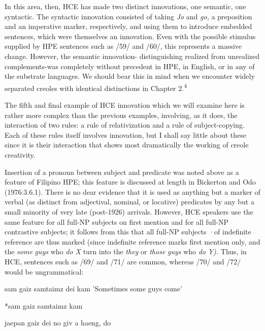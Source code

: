 In this area, then, HCE has made two distinct innovations, one semantic, one syntactic. The syntactic innovation consisted of taking \textit{Jo} and \textit{go,} a preposition and an imperative marker, respectively, and using them to introduce embedded sentences, which were themselves an innovation. Even with the possible stimulus supplied by HPE sen\-tences such as /59/ and /60/, this represents a massive change. However, the semantic innovation- distinguishing realized from unrealized com\-plements-was completely without precedent in HPE, in English, or in any of the substrate languages. We should bear this in mind when we encounter widely separated creoles with identical distinctions in Chapter 2.\textsuperscript{4}

The fifth and final example of HCE innovation which we will examine here is rather more complex than the previous examples, involving, as it does, the interaction of two rules: a rule of relativization and a rule of subject-copying. Each of these rules itself involves inno\-vation, but I shall say little about these since it is their interaction that shows most dramatically the working of creole creativity.

  


 


Insertion of a pronoun between subject and predicate was noted above as a feature of Filipino HPE; this feature is discussed at length in Bickerton and Odo (1976:3.6.1). There is no dear evidence that it is used as anything but a marker of verbal (as distinct from adjectival, nominal, or locative) predicates by any but a small minority of very late (post-1926) arrivals. However, HCE speakers use the same feature for all full-NP subjects on first mention and for all full-NP contrastive subjects; it follows from this that all full-NP subjects ·of indefinite refer\-ence are thus marked (since indefinite reference marks first mention only, and the \textit{some} \textit{guys} who \textit{do X }turn into the \textit{they} or \textit{those} \textit{guys }who \textit{do} \textit{Y}\textit{).} Thus, in HCE, sentences such as /69/ and /71/ are common, whereas /70/ and /72/ would be ungrammatical:

\ea\label{ex:69}
 sam gaiz samtaimz dei kam 'Sometimes some guys come'
\glt
\z

\ea\label{ex:70}
 *sam gaiz samtaimz kam
\glt
\z

\ea\label{ex:71}
 jaepan gaiz dei no giv a haeng, do
\glt
\z

